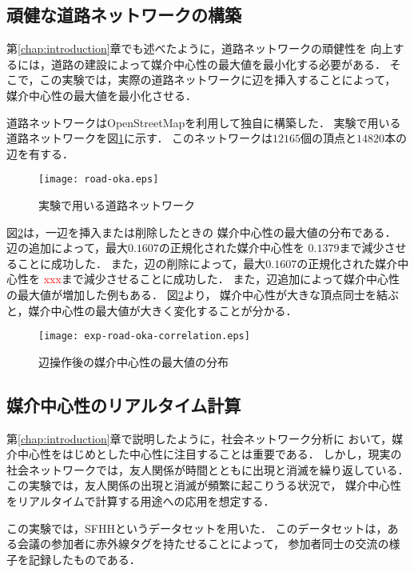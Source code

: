 \subsection{頑健な道路ネットワークの構築}
\label{subsect:exp-road}

第\ref{chap:introduction}章でも述べたように，道路ネットワークの頑健性を
向上するには，道路の建設によって媒介中心性の最大値を最小化する必要がある．
そこで，この実験では，実際の道路ネットワークに辺を挿入することによって，
媒介中心性の最大値を最小化させる．

道路ネットワークはOpenStreetMap\cite{OpenStreetMap}を利用して独自に構築した．
実験で用いる道路ネットワークを図\ref{fig:road-okayama}に示す．
このネットワークは$12165$個の頂点と$14820$本の辺を有する．

\begin{figure}[tb]
  \centering
  \texttt{[image: road-oka.eps]}
  \caption{実験で用いる道路ネットワーク}
  \label{fig:road-okayama}
\end{figure}

図\ref{fig:exp-road-oka-correlation}は，一辺を挿入または削除したときの
媒介中心性の最大値の分布である．
辺の追加によって，最大$0.1607$の正規化された媒介中心性を
$0.1379$まで減少させることに成功した．
また，辺の削除によって，最大$0.1607$の正規化された媒介中心性を
\textcolor{red}{xxx}まで減少させることに成功した．
また，辺追加によって媒介中心性の最大値が増加した例もある．
図\ref{fig:exp-road-oka-correlation}より，
媒介中心性が大きな頂点同士を結ぶと，媒介中心性の最大値が大きく変化することが分かる．

\begin{figure}[tb]
  \centering
  \texttt{[image: exp-road-oka-correlation.eps]}
  \caption{辺操作後の媒介中心性の最大値の分布}
  \label{fig:exp-road-oka-correlation}
\end{figure}

\subsection{媒介中心性のリアルタイム計算}
\label{subsect:exp-sfhh}

第\ref{chap:introduction}章で説明したように，社会ネットワーク分析に
おいて，媒介中心性をはじめとした中心性に注目することは重要である．
しかし，現実の社会ネットワークでは，友人関係が時間とともに出現と消滅を繰り返している．
この実験では，友人関係の出現と消滅が頻繁に起こりうる状況で，
媒介中心性をリアルタイムで計算する用途への応用を想定する．

この実験では，SFHH\cite{Genois2018}というデータセットを用いた．
このデータセットは，ある会議の参加者に赤外線タグを持たせることによって，
参加者同士の交流の様子を記録したものである．

